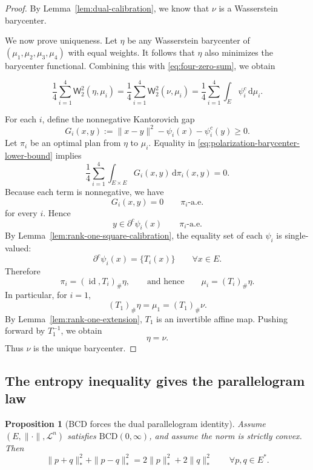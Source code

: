 \documentclass[10pt,a4paper]{amsart}
\numberwithin{equation}{section}
\newtheorem{proposition}[theorem]{Proposition}
\newcommand{\id}{\operatorname{id}}
\newcommand{\dd}{\mathrm d}
\begin{document}
	\begin{proof}
		By Lemma~\ref{lem:dual-calibration}, we know that \(\nu\) is a Wasserstein barycenter. 
		
		We now prove uniqueness. Let \(\eta\) be any Wasserstein barycenter of
		\((\mu_1,\mu_2,\mu_3,\mu_4)\) with equal weights. It follows that 
		\(\eta\) also minimizes the barycenter functional. Combining this with \eqref{eq:four-zero-sum}, we obtain
		
		\begin{equation}\label{eq:polarization-barycenter-lower-bound}
			\frac14\sum_{i=1}^4 \mathsf W_2^2(\eta,\mu_i)
			=
			\frac14\sum_{i=1}^4 \mathsf W_2^2(\nu,\mu_i)
			=
			\frac14\sum_{i=1}^4\int_E\psi_i^c\,\dd\mu_i.
		\end{equation}
		
		For each \(i\), define the nonnegative Kantorovich gap
		\[
		G_i(x,y):=\|x-y\|^2-\psi_i(x)-\psi_i^c(y)\ge0.
		\]
		Let \(\pi_i\) be an optimal plan from \(\eta\) to \(\mu_i\). Equality in \eqref{eq:polarization-barycenter-lower-bound} implies
		\[
		\frac14\sum_{i=1}^4\int_{E\times E}G_i(x,y)\,\dd\pi_i(x,y)=0.
		\]
		Because each term is nonnegative, we have
		\[
		G_i(x,y)=0
		\qquad \pi_i\text{-a.e.}
		\]
		for every \(i\). Hence
		\[
		y\in\partial^c\psi_i(x)
		\qquad \pi_i\text{-a.e.}
		\]
		By Lemma~\ref{lem:rank-one-square-calibration}, the equality set of each
		\(\psi_i\) is single-valued:
		\[
		\partial^c\psi_i(x)=\{T_i(x)\}
		\qquad\forall x\in E.
		\]
		Therefore
		\[
		\pi_i=(\id,T_i)_\#\eta,
		\qquad\text{and hence}\qquad
		\mu_i=(T_i)_\#\eta.
		\]
		In particular, for \(i=1\),
		\[
		(T_1)_\#\eta=\mu_1=(T_1)_\#\nu.
		\]
		By Lemma~\ref{lem:rank-one-extension}, \(T_1\) is an invertible affine map.
		Pushing forward by \(T_1^{-1}\), we obtain
		\[
		\eta=\nu.
		\]
		Thus \(\nu\) is the unique barycenter.
	\end{proof}
	
	\subsection{The entropy inequality gives the parallelogram law}\label{subsec:entropy-parallelogram}
	
	\begin{proposition}[BCD forces the dual parallelogram identity]
		\label{prop:dual-parallelogram}
		Assume \((E,\|\cdot\|,\mathcal L^n)\) satisfies \(\mathrm{BCD}(0,\infty)\), and assume the norm is strictly convex. Then
		\begin{equation}\label{eq:dual-parallelogram}
			\|p+q\|_*^2+\|p-q\|_*^2
			=2\|p\|_*^2+2\|q\|_*^2
			\qquad\forall p,q\in E^*.
		\end{equation}
	\end{proposition}
	
\end{document}
